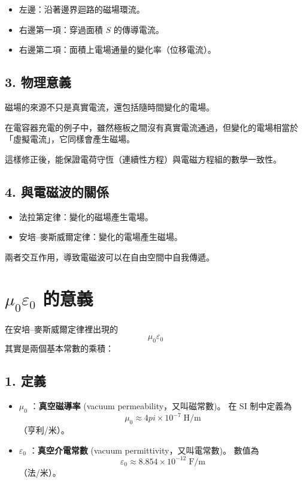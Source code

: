 \documentclass{article}
\def\pi{pi}%
\begin{document}
\begin{itemize}
  \item 左邊：沿著邊界迴路的磁場環流。
  \item 右邊第一項：穿過面積 $S$ 的傳導電流。
  \item 右邊第二項：面積上電場通量的變化率（位移電流）。
\end{itemize}

\subsection*{3. 物理意義}
磁場的來源不只是真實電流，還包括隨時間變化的電場。

在電容器充電的例子中，雖然極板之間沒有真實電流通過，但變化的電場相當於「虛擬電流」，它同樣會產生磁場。

這樣修正後，能保證電荷守恆（連續性方程）與電磁方程組的數學一致性。

\subsection*{4. 與電磁波的關係}
\begin{itemize}
  \item 法拉第定律：變化的磁場產生電場。
  \item 安培--麥斯威爾定律：變化的電場產生磁場。
\end{itemize}

兩者交互作用，導致電磁波可以在自由空間中自我傳遞。
\section*{$\mu_0 \varepsilon_0$ 的意義}

在安培--麥斯威爾定律裡出現的
\[
\mu_0 \varepsilon_0
\]
其實是兩個基本常數的乘積：

\subsection*{1. 定義}

\begin{itemize}
  \item $\mu_0$ ：\textbf{真空磁導率} (vacuum permeability，又叫磁常數)。  
  在 SI 制中定義為
  \[
  \mu_0 \approx 4\pi \times 10^{-7}\; \text{H/m}
  \]
  （亨利/米）。
  
  \item $\varepsilon_0$ ：\textbf{真空介電常數} (vacuum permittivity，又叫電常數)。  
  數值為
  \[
  \varepsilon_0 \approx 8.854 \times 10^{-12}\; \text{F/m}
  \]
  （法/米）。
\end{itemize}
\end{document}
